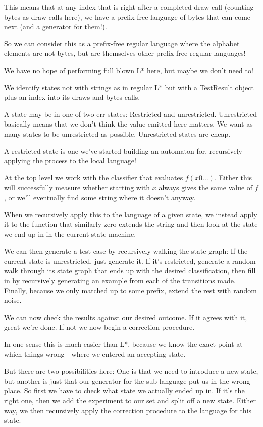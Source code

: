 \documentclass[a4paper]{book}
\begin{document}
This means that at any index that is right after a completed draw call (counting bytes as draw calls here),
we have a prefix free language of bytes that can come next (and a generator for them!).

So we can consider this as a prefix-free regular language where the alphabet elements are not bytes,
but are themselves other prefix-free regular languages!

We have no hope of performing full blown L* here,
but maybe we don't need to!

We identify states not with strings as in regular L* but with a TestResult object plus an index into its draws and bytes calls.

A state may be in one of two err states:
Restricted and unrestricted.
Unrestricted basically means that we don't think the value emitted here matters.
We want as many states to be unrestricted as possible.
Unrestricted states are cheap.

A restricted state is one we've started building an automaton for,
recursively applying the process to the local language!

At the top level we work with the classifier that evaluates \(f(x0\ldots)\).
Either this will successfully measure whether starting with \(x\) always gives the same value of \(f\),
or we'll eventually find some string where it doesn't anyway.

When we recursively apply this to the language of a given state,
we instead apply it to the function that similarly zero-extends the string and then look at the state we end up in in the current state machine.

We can then generate a test case by recursively walking the state graph:
If the current state is unrestricted,
just generate it.
If it's restricted,
generate a random walk through its state graph that ends up with the desired classification,
then fill in by recursively generating an example from each of the transitions made.
Finally, because we only matched up to some prefix, extend the rest with random noise.

We can now check the results against our desired outcome.
If it agrees with it, great we're done.
If not we now begin a correction procedure.

In one sense this is much easier than L*,
because we know the exact point at which things wrong---where
we entered an accepting state.

But there are two possibilities here:
One is that we need to introduce a new state,
but another is just that our generator for the sub-language put us in the wrong place.
So first we have to check what state we actually ended up in.
If it's the right one,
then we add the experiment to our set and split off a new state.
Either way, we then recursively apply the correction procedure to the language for this state.
\end{document}
